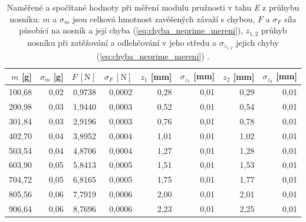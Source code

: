 \documentclass[english]{article}
\newcommand{\unit}[1]{\mathrm{#1}}
\begin{document}
\begin{table}[h!]
  \centering
       \begin{tabular}{|r|r|r|r|r|r|r|r|}
       \hline
       $m$ [g] & $\sigma_m$ [g] & $F\unit{\ [N]}$ & $\sigma_{F}\unit{\ [N]}$ & $z_1$ [mm] & $\sigma_{z_1}$ [mm] & $z_2$ [mm] & $\sigma_{z_2}$ [mm] \bigstrut\\
       \hline
       100,68 & 0,02  & 0,9738 & 0,0002 & 0,28  & 0,01  & 0,29  & 0,01 \bigstrut\\
       \hline
       200,98 & 0,03  & 1,9440 & 0,0003 & 0,52  & 0,01  & 0,54  & 0,01 \bigstrut\\
       \hline
       301,84 & 0,03  & 2,9196 & 0,0003 & 0,76  & 0,01  & 0,78  & 0,01 \bigstrut\\
       \hline
       402,70 & 0,04  & 3,8952 & 0,0004 & 1,01  & 0,01  & 1,02  & 0,01 \bigstrut\\
       \hline
       503,54 & 0,04  & 4,8706 & 0,0004 & 1,27  & 0,01  & 1,28  & 0,01 \bigstrut\\
       \hline
       603,90 & 0,05  & 5,8413 & 0,0005 & 1,51  & 0,01  & 1,53  & 0,01 \bigstrut\\
       \hline
       704,72 & 0,05  & 6,8165 & 0,0005 & 1,75  & 0,01  & 1,77  & 0,01 \bigstrut\\
       \hline
       805,56 & 0,06  & 7,7919 & 0,0006 & 2,00  & 0,01  & 2,01  & 0,01 \bigstrut\\
       \hline
       906,64 & 0,06  & 8,7696 & 0,0006 & 2,23  & 0,01  & 2,25  & 0,01 \bigstrut\\
       \hline
       \end{tabular}%
 \caption{Naměřené a spočítané hodnoty při měření modulu pružnosti v tahu \emph{E} z průhybu nosníku: $m$ a $\sigma_m$ jsou celková hmotnost zavěšených závaží s chybou, $F$ a $\sigma_{F}$ síla působící na nosník a její chyba (\ref{eq:chyba_neprime_mereni}), $z_{1,2}$ průhyb nosníku při zatěžování a odlehčování v jeho středu a $\sigma_{z_{1,2}}$ jejich chyby (\ref{eq:chyba_neprime_mereni}) . }
 \label{tab:E2}%
\end{table}%
	
\end{document}
